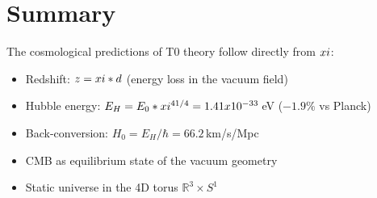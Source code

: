 \section{Summary}

The cosmological predictions of T0 theory follow directly from $xi$:

\begin{itemize}
\item Redshift: $z = xi * d$ (energy loss in the vacuum field)
\item Hubble energy: $E_H = E_0 * xi^{41/4} = 1.41 x 10^{-33}\,$eV 
($-1.9\%$ vs Planck)
\item Back-conversion: $H_0 = E_H / \hbar = 66.2\,$km/s/Mpc
\item CMB as equilibrium state of the vacuum geometry
\item Static universe in the 4D torus $\mathbb{R}^3 \times S^1$
\end{itemize}

